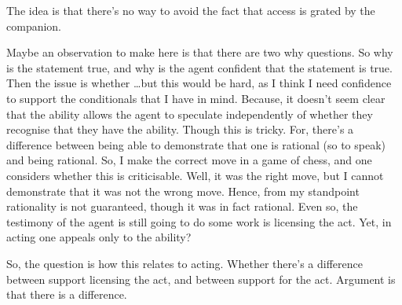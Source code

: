 \documentclass[10pt]{article}
\begin{document}
{
  \color{red}
  The idea is that there's no way to avoid the fact that access is grated by the companion.

  Maybe an observation to make here is that there are two why questions.
  So why is the statement true, and why is the agent confident that the statement is true.
  Then the issue is whether \dots but this would be hard, as I think I need confidence to support the conditionals that I have in mind.
  Because, it doesn't seem clear that the ability allows the agent to speculate independently of whether they recognise that they have the ability.
  Though this is tricky.
  For, there's a difference between being able to demonstrate that one is rational (so to speak) and being rational.
  So, I make the correct move in a game of chess, and one considers whether this is criticisable.
  Well, it was the right move, but I cannot demonstrate that it was not the wrong move.
  Hence, from my standpoint rationality is not guaranteed, though it was in fact rational.
  Even so, the testimony of the agent is still going to do some work is licensing the act.
  Yet, in acting one appeals only to the ability?

  So, the question is how this relates to acting.
  Whether there's a difference between support licensing the act, and between support for the act.
  Argument is that there is a difference.
}
\end{document}
